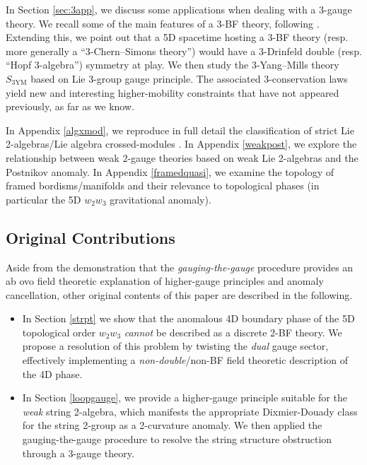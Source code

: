 \documentclass[onecolumn]{article}
\theoremstyle{theorem}
\theoremstyle{remark}
\theoremstyle{example}
\theoremstyle{definition}
\numberwithin{equation}{section}
\begin{document}
In Section \ref{sec:3app}, we discuss some applications when dealing with a 3-gauge theory. We recall some of the main features of a 3-BF theory, following \cite{Radenkovic:2019qme}. Extending this, we point out that a 5D spacetime hosting a 3-BF theory (resp. more generally a ``3-Chern--Simons theory'') would have a 3-Drinfeld double (resp. ``Hopf 3-algebra'') symmetry at play. We then  study the 3-Yang--Mills theory $S_\text{3YM}$ based on Lie 3-group gauge principle. The associated 3-conservation laws yield new and interesting higher-mobility constraints that have not appeared previously, as far as we know.


In Appendix \ref{algxmod}, we reproduce in full detail the classification of strict Lie 2-algebras/Lie algebra crossed-modules \cite{Wag:2006}. In Appendix \ref{weakpost}, we explore the relationship between weak 2-gauge theories based on weak Lie 2-algebras \cite{Kim:2019owc,Baez:2005sn} and the Postnikov anomaly. In Appendix \ref{framedquasi}, we examine the topology of framed bordisms/manifolds and their relevance to topological phases (in particular the 5D $w_2w_3$ gravitational anomaly).


\subsection{Original Contributions}
Aside from the demonstration that the \textit{{gauging-the-gauge}} procedure provides an {ab ovo} %
 field theoretic explanation of higher-gauge principles and anomaly cancellation, other original contents of this paper are described in the following.

\begin{itemize}
    \item In Section \ref{strpt} we show that the anomalous 4D boundary phase of the 5D topological order $w_2w_3$ \textit{{cannot}} be described as a discrete 2-BF theory. We propose a resolution of this problem by twisting the \textit{{dual}} gauge sector, effectively implementing a \textit{{non-double}}/non-BF field theoretic description of the 4D phase.
    \item In Section \ref{loopgauge}, we provide a higher-gauge principle suitable for the \textit{{weak}} string 2-algebra, which manifests the appropriate Dixmier-Douady class for the string 2-group as a 2-curvature anomaly. We then applied the gauging-the-gauge procedure to resolve the string structure obstruction through a 3-gauge theory. 
\end{itemize}
\end{document}
